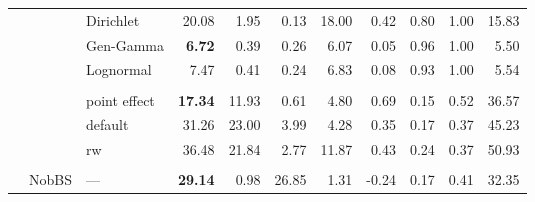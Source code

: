 \documentclass[12pt]{article}
\begin{document}
\begin{table}[!htb]
\begin{tabular}{r | >{\raggedleft\arraybackslash}p{0.55in} | >{\raggedleft\arraybackslash}p{0.85in} | r r r r r r r r}
\\
& \multirow{3}{*}{SIR}
& \cellcolor{delayC!25}Dirichlet & \cellcolor{delayC!25}20.08 & \cellcolor{delayC!25}1.95 & \cellcolor{delayC!25}0.13 & \cellcolor{delayC!25}18.00 & \cellcolor{delayC!25}0.42 & \cellcolor{delayC!25}0.80 & \cellcolor{delayC!25}1.00 & \cellcolor{delayC!25}15.83 \\
& & \cellcolor{delayB!25}Gen-Gamma & \cellcolor{delayB!25}\bf 6.72 & \cellcolor{delayB!25}0.39 & \cellcolor{delayB!25}0.26 & \cellcolor{delayB!25}6.07 & \cellcolor{delayB!25}0.05 & \cellcolor{delayB!25}0.96 & \cellcolor{delayB!25}1.00 & \cellcolor{delayB!25}5.50 \\
& & \cellcolor{delayA!25}Lognormal & \cellcolor{delayA!25}7.47 & \cellcolor{delayA!25}0.41 & \cellcolor{delayA!25}0.24 & \cellcolor{delayA!25}6.83 & \cellcolor{delayA!25}0.08 & \cellcolor{delayA!25}0.93 & \cellcolor{delayA!25}1.00 & \cellcolor{delayA!25}5.54 \\
\\
& \multirow{3}{*}{\texttt{epinowcast}}
& point effect & \bf 17.34 & 11.93 & 0.61 & 4.80 & 0.69 & 0.15 & 0.52 & 36.57 \\
& & default      & 31.26 & 23.00 & 3.99 & 4.28 & 0.35 & 0.17 & 0.37 & 45.23 \\
& & rw           & 36.48 & 21.84 & 2.77 & 11.87 & 0.43 & 0.24 & 0.37 & 50.93 \\
\\
& NobBS & — & \bf 29.14 & 0.98 & 26.85 & 1.31 & -0.24 & 0.17 & 0.41 & 32.35 \\

\midrule


\end{tabular}
\end{table}
\end{document}
